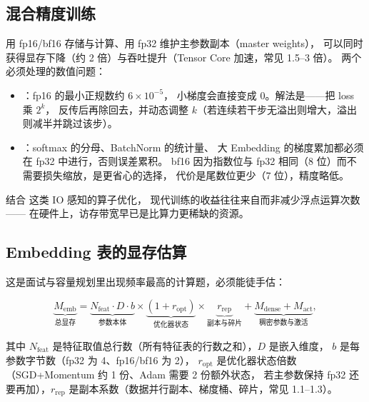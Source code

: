 \subsection{混合精度训练}

用 fp16/bf16 存储与计算、用 fp32 维护主参数副本（master weights），
可以同时获得显存下降（约 2 倍）与吞吐提升（Tensor Core 加速，常见 1.5--3 倍）。
两个必须处理的数值问题：

\begin{itemize}
  \item {}：fp16 的最小正规数约 $6\times 10^{-5}$，
        小梯度会直接变成 0。解法是——把 loss 乘 $2^{k}$，
        反传后再除回去，并动态调整 $k$（若连续若干步无溢出则增大，溢出则减半并跳过该步）。
  \item {}：softmax 的分母、BatchNorm 的统计量、
        大 Embedding 的梯度累加都必须在 fp32 中进行，否则误差累积。
        bf16 因为指数位与 fp32 相同（8 位）而不需要损失缩放，是更省心的选择，
        代价是尾数位更少（7 位），精度略低。
\end{itemize}

结合  \cite{dao2022flashattention} 这类 IO 感知的算子优化，
现代训练的收益往往来自而非减少浮点运算次数——
在硬件上，访存带宽早已是比算力更稀缺的资源。

\subsection{Embedding 表的显存估算}

这是面试与容量规划里出现频率最高的计算题，必须能徒手估：

\begin{equation}
\underbrace{M_{\text{emb}}}_{\text{总显存}}
= \underbrace{N_{\text{feat}} \cdot D \cdot b}_{\text{参数本体}}
\times \underbrace{(1 + r_{\text{opt}})}_{\text{优化器状态}}
\times \underbrace{r_{\text{rep}}}_{\text{副本与碎片}}
+ \underbrace{M_{\text{dense}} + M_{\text{act}}}_{\text{稠密参数与激活}} ,
\label{eq:emb-mem}
\end{equation}

其中 $N_{\text{feat}}$ 是特征取值总行数（所有特征表的行数之和），$D$ 是嵌入维度，
$b$ 是每参数字节数（fp32 为 4、fp16/bf16 为 2），
$r_{\text{opt}}$ 是优化器状态倍数（SGD+Momentum 约 1 份、Adam 需要 2 份额外状态，
若主参数保持 fp32 还要再加），$r_{\text{rep}}$ 是副本系数（数据并行副本、梯度桶、碎片，常见 1.1--1.3）。

